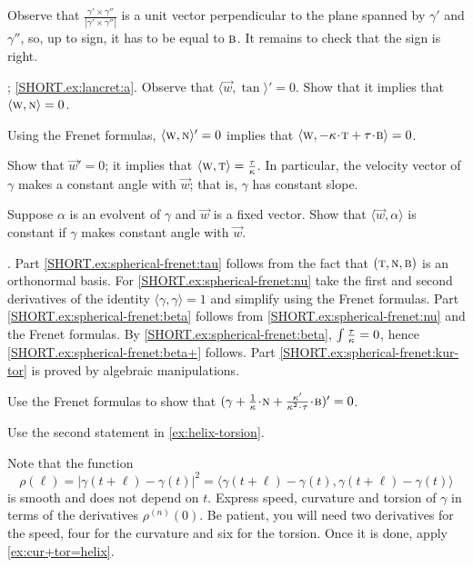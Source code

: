  Observe that $\tfrac{\gamma'\times\gamma''}{|\gamma'\times\gamma''|}$ is a unit vector perpendicular to the plane spanned by $\gamma'$ and $\gamma''$, so, up to sign, it has to be equal to $\text{\sc{b}}$.
It remains to check that the sign is right.

\parbf{\ref{ex:lancret}}; \ref{SHORT.ex:lancret:a}.
Observe that 
$\langle \vec w,\tan\rangle'=0$.
Show that it implies that $\langle \text{\sc{w}}, \text{\sc{n}}\rangle =0$.

Using the Frenet formulas,  
$\langle \text{\sc{w}},\text{\sc{n}}\rangle'=0$
 implies that 
$\langle \vec w, -\kur\cdot\tan+\tor\cdot \bi\rangle =0$.

Show that $\vec w'=0$;
it implies that $\langle \text{\sc{w}},\text{\sc{t}}\rangle=\tfrac{\tau}{\kappa}$.
In particular, the velocity vector of $\gamma$ makes a constant angle with $\vec w$; that is, $\gamma$ has constant slope.

Suppose $\alpha$ is an evolvent of $\gamma$ and $\vec w$ is a fixed vector.
Show that $\langle \vec w,\alpha\rangle$ is constant if $\gamma$ makes constant angle with $\vec w$.

\parbf{\ref{ex:spherical-frenet}}.
Part \ref{SHORT.ex:spherical-frenet:tau} follows from the fact that $(  \text{\sc{t}} , \text{\sc{n}}, \text{\sc{b}}  )$ is an orthonormal basis. For \ref{SHORT.ex:spherical-frenet:nu} take the first and second derivatives of the identity $\langle\gamma,\gamma\rangle=1$ and simplify using the Frenet formulas.
Part \ref{SHORT.ex:spherical-frenet:beta} follows from \ref{SHORT.ex:spherical-frenet:nu} and the Frenet formulas.
By \ref{SHORT.ex:spherical-frenet:beta}, $\int\tfrac{\tau}{\kappa}=0$, hence \ref{SHORT.ex:spherical-frenet:beta+} follows.
Part \ref{SHORT.ex:spherical-frenet:kur-tor} is proved by algebraic manipulations.

Use the Frenet formulas to show that $(\gamma+\tfrac1\kur\cdot \norm+\tfrac{\kur'}{\kur^2\cdot\tor}\cdot\bi)'=0$.



 Use the second statement in \ref{ex:helix-torsion}.

 Note that the function
\[\rho(\ell)=|\gamma(t+\ell)-\gamma(t)|^2=\langle \gamma(t+\ell)-\gamma(t),\gamma(t+\ell)-\gamma(t)\rangle\] 
is smooth and does not depend on $t$.
Express speed, curvature and torsion of $\gamma$ in terms of the derivatives $\rho^{(n)}(0)$.
Be patient, you will need two derivatives for the speed,
four for the curvature and six for the torsion.
Once it is done, apply \ref{ex:cur+tor=helix}.
